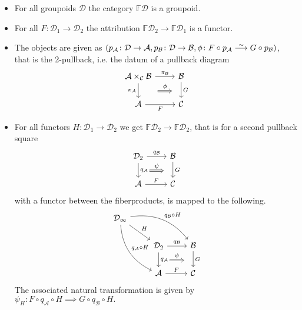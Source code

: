 \begin{itemize}
	\item 
	For all groupoids $ \mathcal{D} $ the category $ \mathbb{F} \mathcal{D} $ is a groupoid.
	
	\item 
	For all $ F \colon \mathcal{D}_1 \to \mathcal{D}_2 $ the attribution $ \mathbb{F} \mathcal{D}_2 \to \mathbb{ F } \mathcal{D}_1 $ is a functor.
	
	\item 
	The objects are given as $ ( p_{ \mathcal{ A } } \colon \mathcal{ D } \to \mathcal{A } , p_{ \mathcal{B } } \colon \mathcal{ D } \to \mathcal{ B } , \phi \colon F \circ p_{ \mathcal{ A } } \isomorphism  G \circ p_{ \mathcal{ B }} ) $,
	that is the 2-pullback, i.e. the datum of a pullback diagram
	\[
	\begin{tikzcd}	
		\mathcal{A} \times_{ \mathcal{ C } } \mathcal{ B}
		\ar[r, " \pi_{ \mathcal{ B } } "]
		\ar[r , shift right=4ex, shorten <=3pt, Rightarrow, shorten >=3pt, " \phi " ]
		\ar[d, " \pi_{ \mathcal{ A }}"']
		&
		\mathcal{B}
		\ar[d, " G "]
		\\ 
		\mathcal{A }
		\ar[r, " F "' ]
		&
		\mathcal{C}
	\end{tikzcd}
	\]
	
	\item 
	For all functors $ H \colon \mathcal{D}_1 \to \mathcal{D}_2$ we get $ \mathbb{F} \mathcal{ D }_2 \to \mathbb{F} \mathcal{D}_2$, that is for a second pullback square 
	\[
	\begin{tikzcd}	
		\mathcal{D}_2
		\ar[r, " q_{\mathcal{B } }"]
		\ar[d, " q_{ \mathcal{A} }"]
		\ar[r , shift right=4ex, shorten <=3pt, Rightarrow, shorten >=3pt, " \psi " ]
		&
		\mathcal{B}
		\ar[d, " G "]
		\\
		\mathcal{A} 
		\ar[r, " F "]
		&
		\mathcal{C}
	\end{tikzcd}
	\]
	with a functor between the fiberproducts, is mapped to the following.
	\[
	\begin{tikzcd}
		\mathcal{D_1}
		\ar[rrd, bend left, bend left, " q_{ \mathcal{ B } } \circ H "]
		\ar[rd, " H "]
		\ar[rdd, bend right," q_{ \mathcal{ A } } \circ H "]
		\\
		&
		\mathcal{D }_2 
		\ar[r, " q_{ \mathcal{ B } }"]
		\ar[d, " q_{ \mathcal{ A } }"]
		\ar[r , shift right=4ex, shorten <=3pt, Rightarrow, shorten >=3pt, " \psi " ]
		&
		\mathcal{B}
		\ar[d, " G "]
		\\
		&
		\mathcal{A}
		\ar[r, " F "]
		&
		\mathcal{ C }
	\end{tikzcd}
	\]
	The associated natural transformation is given by 
	$\psi_H \colon F \circ q_{ \mathcal{A} } \circ H \implies G \circ q_{ \mathcal{ B } } \circ H.$
\end{itemize}

